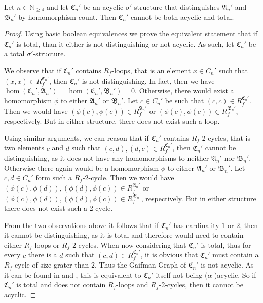 \begin{lemma}
	Let $n\in\mathbb N_{\geq 4}$ and let $\mathfrak C_n'$ be an acyclic $\sigma'$-structure that distinguishes $\mathfrak A_n'$ and $\mathfrak B_n'$ by homomorphism count.
	Then $\mathfrak C_n'$ cannot be both acyclic and total.
	\label{lem:totalityNotEnforcable}
\end{lemma}
\begin{proof}
	Using basic boolean equivalences we prove the equivalent statement that if $\mathfrak C_n'$ is total, than it either is not distinguishing or not acyclic.
	As such, let $\mathfrak C_n'$ be a total $\sigma'$-structure.
	
	We observe that if $\mathfrak C_n'$ contains $R_f$-loops, that is an element $x\in C_n'$ such that $(x, x)\in R_f^{\mathfrak C_n'}$, then $\mathfrak C_n'$ is not distinguishing.
	In fact, then we have $\hom(\mathfrak C_n',\mathfrak A_n')=\hom(\mathfrak C_n',\mathfrak B_n')=0$.
	Otherwise, there would exist a homomorphism $\phi$ to either $\mathfrak A_n'$ or $\mathfrak B_n'$.
	Let $c\in C_n'$ be such that $(c,c)\in R_f^{\mathfrak C_n'}$.
	Then we would have $(\phi(c),\phi(c))\in R_f^{\mathfrak A_n'}$ or $(\phi(c),\phi(c))\in R_f^{\mathfrak B_n'}$, respectively.
	But in either structure, there does not exist such a loop.
	
	Using similar arguments, we can reason that if $\mathfrak C_n'$ contains $R_f$-2-cycles, that is two elements $c$ and $d$ such that $(c, d), (d, c)\in R_f^{\mathfrak C_n'}$, then $\mathfrak C_n'$ cannot be distinguishing, as it does not have any homomorphisms to neither $\mathfrak A_n'$ nor $\mathfrak B_n'$.
	Otherwise there again would be a homomorphism $\phi$ to either $\mathfrak A_n'$ or $\mathfrak B_n'$.
	Let $c,d\in C_n'$ form such a $R_f$-2-cycle.
	Then we would have $(\phi(c),\phi(d)),(\phi(d),\phi(c))\in R_f^{\mathfrak A_n'}$ or $(\phi(c),\phi(d)),(\phi(d),\phi(c))\in R_f^{\mathfrak B_n'}$, respectively.
	But in either structure there does not exist such a 2-cycle.
	
	From the two observations above it follows that if $\mathfrak C_n'$ has cardinality $1$ or $2$, then it cannot be distinguishing, as it is total and therefore would need to contain either $R_f$-loops or $R_f$-2-cycles.
	When now considering that $\mathfrak C_n'$ is total, thus for every $c$ there is a $d$ such that $(c,d)\in R_f^{\mathfrak C_n'}$, it is obvious that $\mathfrak C_n'$ must contain a $R_f$ cycle of size grater than $2$.
	Thus the Gaifman-Graph of $\mathfrak C_n'$ is not acyclic. 
	As it can be found in \cite{scheidt2025ColorRefinement} and \cite{brault-baron2014HypergraphAcyclicity}, this is equivalent to $\mathfrak C_n'$ itself not being ($\alpha$-)acyclic.
	So if $\mathfrak C_n'$ is total and does not contain $R_f$-loops and $R_f$-2-cycles, then it cannot be acyclic.
\end{proof}

